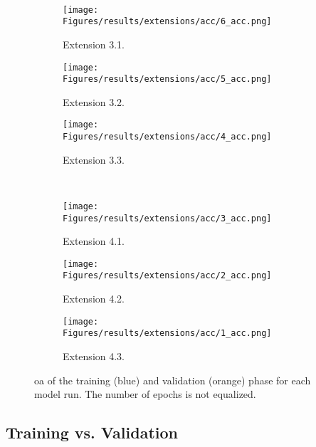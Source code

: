 \begin{figure}[!htb]
    \\
    \begin{subfigure}{.325\textwidth}
        \centering
        \texttt{[image: Figures/results/extensions/acc/6\_acc.png]}
        \caption{Extension 3.1.}
    \end{subfigure}
    \begin{subfigure}{.325\textwidth}
        \centering
        \texttt{[image: Figures/results/extensions/acc/5\_acc.png]}
        \caption{Extension 3.2.}
    \end{subfigure}
    \begin{subfigure}{.325\textwidth}
        \centering
        \texttt{[image: Figures/results/extensions/acc/4\_acc.png]}
        \caption{Extension 3.3.}
    \end{subfigure}
    \\
    \begin{subfigure}{.325\textwidth}
        \centering
        \texttt{[image: Figures/results/extensions/acc/3\_acc.png]}
        \caption{Extension 4.1.}
    \end{subfigure}
    \begin{subfigure}{.325\textwidth}
        \centering
        \texttt{[image: Figures/results/extensions/acc/2\_acc.png]}
        \caption{Extension 4.2.}
    \end{subfigure}
    \begin{subfigure}{.325\textwidth}
        \centering
        \texttt{[image: Figures/results/extensions/acc/1\_acc.png]}
        \caption{Extension 4.3.}
    \end{subfigure}
    \caption[ Plots of All Model Runs]{\gls{oa} of the training (blue) and validation (orange) phase for each model run. The number of epochs is not equalized.}
\end{figure}

\clearpage

\subsection{Training vs. Validation }
\label{app:iou}

